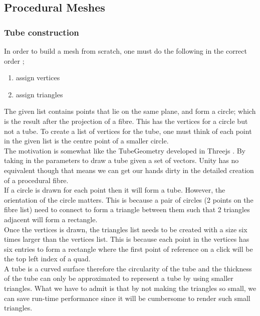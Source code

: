 \documentclass[12pt]{article} %
\begin{document}
\begin{flushleft}
\subsection{Procedural Meshes} %
\subsubsection{Tube construction} %
In order to build a mesh from scratch, one must do the following in the correct order \cite{unity:manualmesh};
\begin{enumerate}
\item assign vertices
\item assign triangles
\end{enumerate}
The given list contains points that lie on the same plane, and form a circle; which is the result after the projection of a fibre. This has the vertices for a circle but not a tube. To create a list of vertices for the tube, one must think of each point in the given list is the centre point of a smaller circle.\\
The motivation is somewhat like the TubeGeometry developed in Threejs \cite{threejs:tube}. By taking in the parameters to draw a tube given a set of vectors. Unity has no equivalent though that means we can get our hands dirty in the detailed creation of a procedural fibre.\\
If a circle is drawn for each point then it will form a tube. However, the orientation of the circle matters. This is because a pair of circles (2 points on the fibre list) need to connect to form a triangle between them such that 2 triangles adjacent will form a rectangle.\\
Once the vertices is drawn, the triangles list needs to be created with a size six times larger than the vertices list. This is because each point in the vertices has six entries to form a rectangle where the first point of reference on a click will be the top left index of a quad.\\
A tube is a curved surface therefore the circularity of the tube and the thickness of the tube can only be approximated to represent a tube by using smaller triangles. What we have to admit is that by not making the triangles so small, we can save run-time performance since it will be cumbersome to render such small triangles. \\

\end{flushleft}
\end{document}
